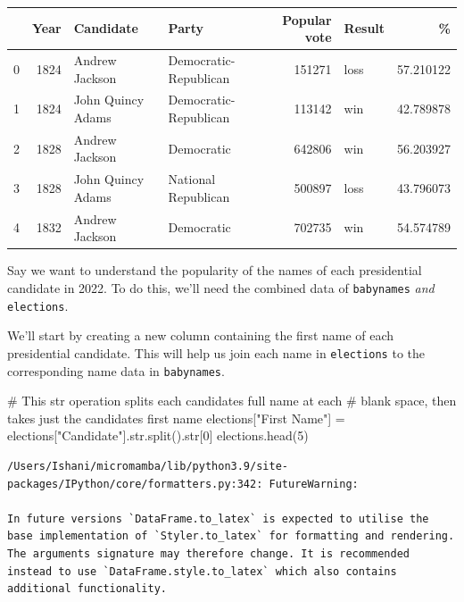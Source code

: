 \documentclass[
  letterpaper,
  DIV=11,
  numbers=noendperiod]{scrreprt}
\newenvironment{Shaded}{\begin{snugshade}}{\end{snugshade}}
\newcommand{\BuiltInTok}[1]{\textcolor[rgb]{0.00,0.23,0.31}{#1}}
\newcommand{\CommentTok}[1]{\textcolor[rgb]{0.37,0.37,0.37}{#1}}
\newcommand{\DecValTok}[1]{\textcolor[rgb]{0.68,0.00,0.00}{#1}}
\newcommand{\NormalTok}[1]{\textcolor[rgb]{0.00,0.23,0.31}{#1}}
\newcommand{\OperatorTok}[1]{\textcolor[rgb]{0.37,0.37,0.37}{#1}}
\newcommand{\StringTok}[1]{\textcolor[rgb]{0.13,0.47,0.30}{#1}}
\begin{document}
\begin{tabular}{lrllrlr}
\toprule
{} &  Year &          Candidate &                  Party &  Popular vote & Result &          \% \\
\midrule
0 &  1824 &     Andrew Jackson &  Democratic-Republican &        151271 &   loss &  57.210122 \\
1 &  1824 &  John Quincy Adams &  Democratic-Republican &        113142 &    win &  42.789878 \\
2 &  1828 &     Andrew Jackson &             Democratic &        642806 &    win &  56.203927 \\
3 &  1828 &  John Quincy Adams &    National Republican &        500897 &   loss &  43.796073 \\
4 &  1832 &     Andrew Jackson &             Democratic &        702735 &    win &  54.574789 \\
\bottomrule
\end{tabular}

Say we want to understand the popularity of the names of each
presidential candidate in 2022. To do this, we'll need the combined data
of \texttt{babynames} \emph{and} \texttt{elections}.

We'll start by creating a new column containing the first name of each
presidential candidate. This will help us join each name in
\texttt{elections} to the corresponding name data in \texttt{babynames}.

\begin{Shaded}
\begin{Highlighting}[]
\CommentTok{\# This \textasciigrave{}str\textasciigrave{} operation splits each candidate\textquotesingle{}s full name at each }
\CommentTok{\# blank space, then takes just the candidate\textquotesingle{}s first name}
\NormalTok{elections[}\StringTok{"First Name"}\NormalTok{] }\OperatorTok{=}\NormalTok{ elections[}\StringTok{"Candidate"}\NormalTok{].}\BuiltInTok{str}\NormalTok{.split().}\BuiltInTok{str}\NormalTok{[}\DecValTok{0}\NormalTok{]}
\NormalTok{elections.head(}\DecValTok{5}\NormalTok{)}
\end{Highlighting}
\end{Shaded}

\begin{verbatim}
/Users/Ishani/micromamba/lib/python3.9/site-packages/IPython/core/formatters.py:342: FutureWarning:

In future versions `DataFrame.to_latex` is expected to utilise the base implementation of `Styler.to_latex` for formatting and rendering. The arguments signature may therefore change. It is recommended instead to use `DataFrame.style.to_latex` which also contains additional functionality.
\end{verbatim}
\end{document}
